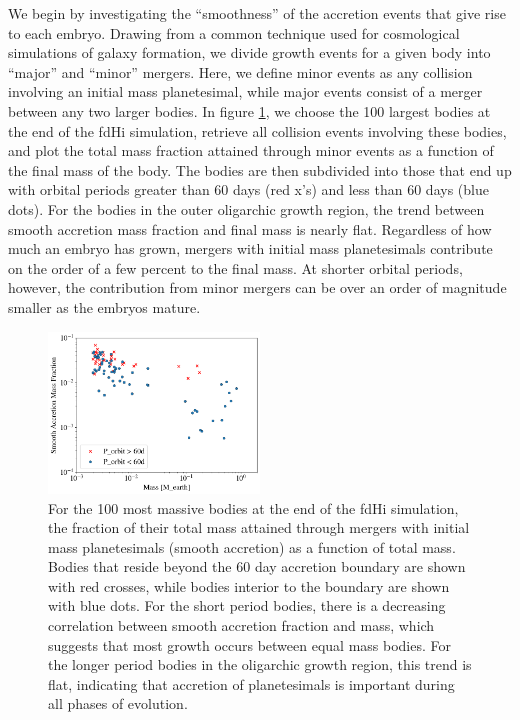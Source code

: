 \documentclass[twocolumn]{aastex63}
\begin{document}
We begin by investigating the ``smoothness'' of the accretion events
that give rise to each embryo. Drawing from a common technique used
for cosmological simulations of galaxy formation, we divide growth events for
a given body into ``major'' and ``minor'' mergers. Here, we define minor events as any collision involving an initial mass 
planetesimal, while major events consist of a merger between any two larger bodies. In figure \ref{fig:minor_frac}, we choose the 
100 largest bodies at the end of the fdHi simulation, retrieve all collision events involving these bodies, and plot the total mass 
fraction attained through minor events as a function of the final mass of the body. The bodies are then subdivided into those that 
end up with orbital periods greater than 60 days (red x's) and less than 60 days (blue dots). For the bodies in the outer oligarchic 
growth region, the trend between smooth accretion mass fraction and final mass is nearly flat. Regardless of how much an 
embryo has grown, mergers with initial mass planetesimals contribute on the order of a few percent to the final mass.
At shorter orbital periods, however, the contribution from minor mergers can be over an order of magnitude smaller as the 
embryos mature.

\begin{figure}
\begin{center}
    \includegraphics[width=0.5\textwidth]{figures/minor_frac.png}
    \caption{For the 100 most massive bodies at the end of the fdHi simulation, the fraction of their total mass attained through mergers with initial mass planetesimals (smooth accretion) as a function of total mass. Bodies that reside beyond the 60 day accretion boundary are shown with red crosses, while bodies interior to the boundary are shown with blue dots. For the short period bodies, there is a decreasing correlation between smooth accretion fraction and mass, which suggests that most growth occurs between equal mass bodies. For the longer period bodies in the oligarchic growth region, this trend is flat, indicating that accretion of planetesimals is important during all phases of evolution.\label{fig:minor_frac}}
\end{center}
\end{figure}
\end{document}
